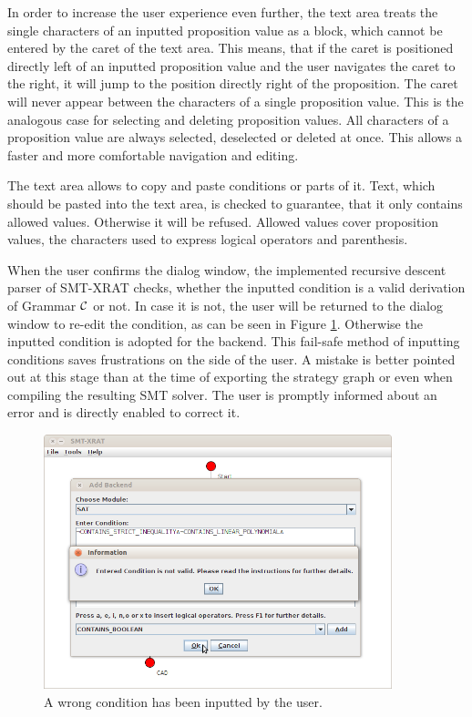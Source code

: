 In order to increase the user experience even further, the text area treats the single characters of an inputted proposition value as a block, which cannot be entered by the caret of the text area. This means, that if the caret is positioned directly left of an inputted proposition value and the user navigates the caret to the right, it will jump to the position directly right of the proposition. The caret will never appear between the characters of a single proposition value. This is the analogous case for selecting and deleting proposition values. All characters of a proposition value are always selected, deselected or deleted at once. This allows a faster and more comfortable navigation and editing.

The text area allows to copy and paste conditions or parts of it. Text, which should be pasted into the text area, is checked to guarantee, that it only contains allowed values. Otherwise it will be refused. Allowed values cover proposition values, the characters used to express logical operators and parenthesis.

When the user confirms the dialog window, the implemented recursive descent parser of SMT-XRAT checks, whether the inputted condition is a valid derivation of Grammar $\cal C$ or not. In case it is not, the user will be returned to the dialog window to re-edit the condition, as can be seen in Figure \ref{fig:smt-xrat_condition_wrong}. Otherwise the inputted condition is adopted for the backend. This fail-safe method of inputting conditions saves frustrations on the side of the user. A mistake is better pointed out at this stage than at the time of exporting the strategy graph or even when compiling the resulting SMT solver. The user is promptly informed about an error and is directly enabled to correct it.
\begin{figure}
  \begin{center}
    \includegraphics[width=0.9\textwidth]{graphics/smt-xrat_condition_wrong.png}
  \end{center}
  \caption{A wrong condition has been inputted by the user.}
  \label{fig:smt-xrat_condition_wrong}
\end{figure}

